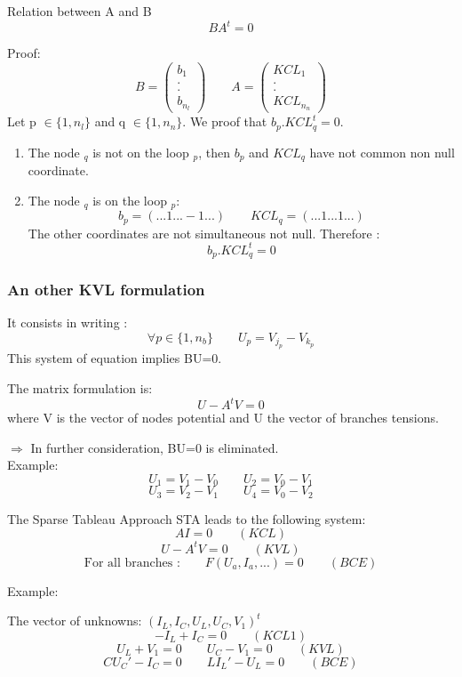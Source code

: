 \frame
{
\begin{block}{Relation between A and B}
\[BA^{t}=0\]
\end{block}
\pause
Proof:
\[B=\left(\begin{array}{c}b_{1}\\.\\.\\b_{n_{l}}\end{array}\right)
\qquad A=\left(\begin{array}{c}KCL_{1}\\.\\.\\KCL_{n_{n}}\end{array}\right)\]
Let p $\in \lbrace 1,n_{l} \rbrace $ and q $\in \lbrace 1,n_{n} \rbrace $. We proof that
$b_{p}.KCL_{q}^{t}=0$.
\begin{figure}[h]
\centerline{
 \scalebox{0.5}{
    
 }
}
\end{figure}

\begin{enumerate}
\item The node $_{q}$ is not on the loop $_{p}$, then $b_{p}$ and $KCL_{q}$ have not common non null coordinate.
\item The node $_{q}$ is on the loop $_{p}$:
\[b_{p}=(...1...-1...)\qquad KCL_{q}=(...1...1...)\]
The other coordinates are not simultaneous not null. Therefore :
\[b_{p}.KCL_{q}^{t}=0\]
\end{enumerate}

}
\frame
{
\frametitle{An other KVL formulation}
\begin{figure}[h]
\centerline{
 \scalebox{0.5}{
    
 }
}
\end{figure}
It consists in writing :
\[\forall p \in \lbrace 1,n_{b} \rbrace \qquad U_{p}=V_{j_{p}}-V_{k_{p}}\]
This system of equation implies BU=0.
\begin{block}{The matrix formulation is:}
\[U-A^{t}V=0\]
where V is the vector of nodes potential and U the vector of branches tensions.\\
\end{block}
$\Rightarrow$ In further consideration, BU=0 is eliminated.\\
Example:
\[U_{1}=V_{1} - V_{0} \qquad U_{2} = V_{0}-V_{1}\]
\[U_{3}=V_{2} - V_{1} \qquad U_{4} = V_{0}-V_{2}\]
}


\frame
{
  \begin{block}{The Sparse Tableau Approach STA leads to the following system:}
  \[AI=0 \qquad (KCL)\]
  \[U-A^{t}V=0 \qquad (KVL)\]
  \[\textrm{For all branches :} \qquad F(U_{a},I_{a},...)=0 \qquad(BCE) \]
  \end{block}  


Example:
  \begin{figure}[h]
   \centerline{
   \scalebox{0.5}{
    
  }
 } 
 \end{figure}
 The vector of unknowns: $(I_{L},I_{C},U_{L},U_{C},V_{1})^{t}$
 \[-I_{L} + I_{C} = 0 \qquad (KCL1)\]
 \[U_{L} + V_{1} = 0 \qquad U_{C} -V_{1}=0\qquad (KVL)\]
 \[CU_{C}'-I_{C}=0 \qquad LI_{L}'-U_{L}=0\qquad (BCE)\]
 
  }
